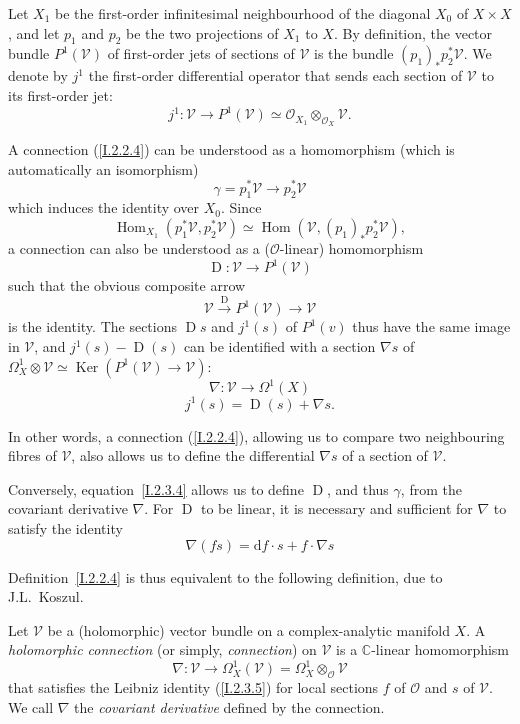 \documentclass{report}
\theoremstyle{plain}
\theoremstyle{definition}
\newenvironment{definition}[1]
    {\renewcommand\theinnercustomdefinition{#1}\innercustomdefinition}
    {\endinnercustomdefinition}
\newenvironment{env}[1]
    {\renewcommand\theinnercustomenv{#1}\innercustomenv}
    {\endinnercustomenv}
\newcommand{\sh}{\mathscr}
\newcommand{\dd}{\mathrm{d}}
\DeclareMathOperator{\Ker}{Ker}
\DeclareMathOperator{\Hom}{Hom}
\DeclareMathOperator{\DD}{D}
\newcommand{\oldpage}[1]{\marginpar{\footnotesize$\Big\vert$ \textit{p.~#1}}}
\begin{document}
\begin{env}{2.3}
\label{I.2.3}
  Let $X_1$ be the first-order infinitesimal neighbourhood of the diagonal $X_0$ of $X\times X$, and let $p_1$ and $p_2$ be the two projections of $X_1$ to $X$.
  By definition, the vector bundle $P^1(\sh{V})$ of first-order jets of sections of $\sh{V}$ is the bundle $(p_1)_*p_2^*\sh{V}$.
  We denote by $j^1$ the first-order differential operator that sends each section of $\sh{V}$ to its first-order jet:
  \[
    j^1\colon \sh{V} \to P^1(\sh{V}) \simeq \sh{O}_{X_1}\otimes_{\sh{O}_X}\sh{V}.
  \]

  A connection (\cref{I.2.2.4}) can be understood as a homomorphism (which is automatically an isomorphism)
  \[
  \label{I.2.3.1}
    \gamma = p_1^*\sh{V} \to p_2^*\sh{V}
  \tag{2.3.1}
  \]
  which induces the identity over $X_0$.
  Since
  \[
    \Hom_{X_1}(p_1^*\sh{V},p_2^*\sh{V}) \simeq \Hom(\sh{V},(p_1)_*p_2^*\sh{V}),
  \]
\oldpage{7}
  a connection can also be understood as a ($\sh{O}$-linear) homomorphism
  \[
  \label{I.2.3.2}
    \DD\colon \sh{V} \to P^1(\sh{V})
  \tag{2.3.2}
  \]
  such that the obvious composite arrow
  \[
    \sh{V}\xrightarrow{\DD} P^1(\sh{V}) \to \sh{V}
  \]
  is the identity.
  The sections $\DD s$ and $j^1(s)$ of $P^1(v)$ thus have the same image in $\sh{V}$, and $j^1(s)-\DD(s)$ can be identified with a section $\nabla s$ of $\Omega_X^1\otimes\sh{V} \simeq \Ker(P^1(\sh{V})\to\sh{V})$:
  \[
  \label{I.2.3.3}
    \nabla\colon \sh{V} \to \Omega^1(X)
  \tag{2.3.3}
  \]
  \[
  \label{I.2.3.4}
    j^1(s) = \DD(s)+\nabla s.
  \tag{2.3.4}
  \]

  In other words, a connection (\cref{I.2.2.4}), allowing us to compare two neighbouring fibres of $\sh{V}$, also allows us to define the differential $\nabla s$ of a section of $\sh{V}$.

  Conversely, equation~\cref{I.2.3.4} allows us to define $\DD$, and thus $\gamma$, from the covariant derivative $\nabla$.
  For $\DD$ to be linear, it is necessary and sufficient for $\nabla$ to satisfy the identity
  \[
  \label{I.2.3.5}
    \nabla(fs) = \dd f\cdot s + f\cdot\nabla s
  \tag{2.3.5}
  \]

  Definition~\cref{I.2.2.4} is thus equivalent to the following definition, due to J.L.~Koszul.
\end{env}

\begin{definition}{2.4}
\label{I.2.4}
  Let $\sh{V}$ be a (holomorphic) vector bundle on a complex-analytic manifold $X$.
  A \emph{holomorphic connection} (or simply, \emph{connection}) on $\sh{V}$ is a $\mathbb{C}$-linear homomorphism
  \[
    \nabla\colon \sh{V} \to \Omega_X^1(\sh{V}) = \Omega_X^1\otimes_{\sh{O}}\sh{V}
  \]
  that satisfies the Leibniz identity (\cref{I.2.3.5}) for local sections $f$ of $\sh{O}$ and $s$ of $\sh{V}$.
  We call $\nabla$ the \emph{covariant derivative} defined by the connection.
\end{definition}
\end{document}

